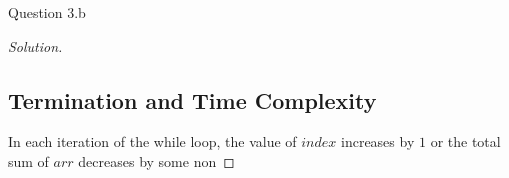 \begin{solution}{Question 3.b}
\begin{proof}[Solution]
        \subsection*{Termination and Time Complexity}
        In each iteration of the while loop, the value of $index$ increases by $1$ or the total sum of $arr$ decreases by some non
    \end{proof}
    
\end{solution}

